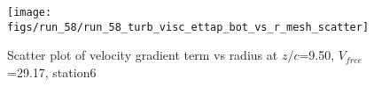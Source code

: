 \begin{figure}[H]
\centering
\texttt{[image: figs/run\_58/run\_58\_turb\_visc\_ettap\_bot\_vs\_r\_mesh\_scatter]}
\caption{Scatter plot of velocity gradient term vs radius at $z/c$=9.50, $V_{free}$=29.17, station6}
\label{fig:run_58_turb_visc_ettap_bot_vs_r_mesh_scatter}
\end{figure}


